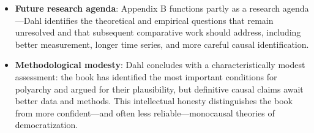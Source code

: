 \documentclass[12pt]{article}
\begin{document}
\begin{itemize}[leftmargin=*, itemsep=4pt]
    \item \textbf{Future research agenda}: Appendix B functions partly as a research agenda---Dahl identifies the theoretical and empirical questions that remain unresolved and that subsequent comparative work should address, including better measurement, longer time series, and more careful causal identification.
    \item \textbf{Methodological modesty}: Dahl concludes with a characteristically modest assessment: the book has identified the most important conditions for polyarchy and argued for their plausibility, but definitive causal claims await better data and methods. This intellectual honesty distinguishes the book from more confident---and often less reliable---monocausal theories of democratization.
\end{itemize}
\end{document}
